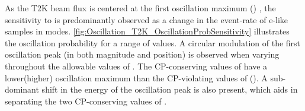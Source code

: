 As the T2K beam flux is centered at the first oscillation maximum () \cite{t2k_det}, the sensitivity to  is predominantly observed as a change in the event-rate of e-like samples in \quickmath{\nu/\bar{\nu}} modes. \autoref{fig:Oscillation_T2K_OscillationProbSensitivity} illustrates the  oscillation probability for a range of  values. %
A circular modulation of the first oscillation peak (in both magnitude and position) is observed when varying throughout the allowable values of . The CP-conserving values of  have a lower(higher) oscillation maximum than the CP-violating values of (). A sub-dominant shift in the energy of the oscillation peak is also present, which aids in separating the two CP-conserving values of .


